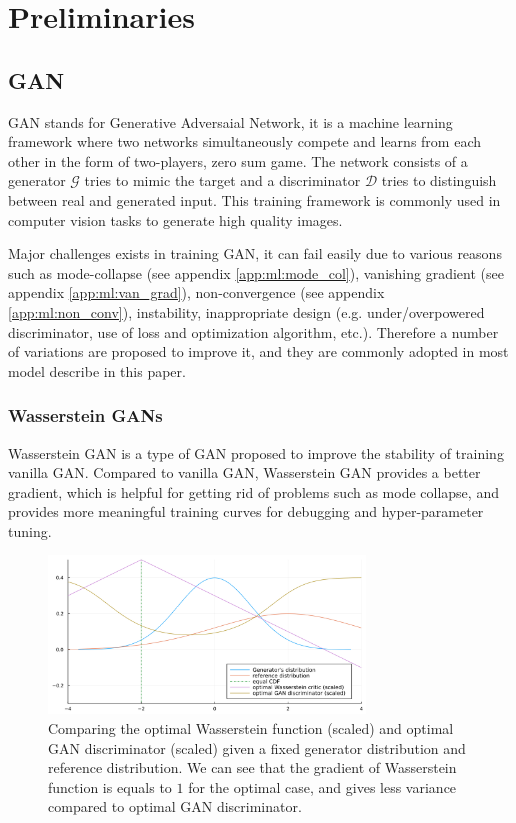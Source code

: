 \chapter{Preliminaries}
\label{chapterlabel2}

\section{GAN}

GAN stands for Generative Adversaial Network\cite{goodfellowGenerativeAdversarialNetworks2014a}, it is a machine learning framework where two networks simultaneously compete and learns from each other in the form of two-players, zero sum game. The network consists of a generator $\mathcal{G}$ tries to mimic the target and a discriminator $\mathcal{D}$ tries to distinguish between real and generated input. This training framework is commonly used in computer vision tasks to generate high quality images.

Major challenges exists in training GAN, it can fail easily due to various reasons such as mode-collapse (see appendix \ref{app:ml:mode_col}), vanishing gradient (see appendix \ref{app:ml:van_grad}), non-convergence (see appendix \ref{app:ml:non_conv}), instability, inappropriate design (e.g. under/overpowered discriminator, use of loss and optimization algorithm, etc.). Therefore a number of variations are proposed to improve it, and they are commonly adopted in most model describe in this paper.


\subsection{Wasserstein GANs}
Wasserstein GAN\cite{arjovskyWassersteinGAN2017} is a type of GAN proposed to improve the stability of training vanilla GAN. Compared to vanilla GAN, Wasserstein GAN provides a better gradient, which is helpful for getting rid of problems such as mode collapse, and provides more meaningful training curves for debugging and hyper-parameter tuning.

\begin{figure}
    \centering
    \includegraphics[width=0.75\textwidth]{images/preliminary/wgan_vs_gan_grad.png}
    \caption{Comparing the optimal Wasserstein function (scaled) and optimal GAN discriminator (scaled) given a fixed generator distribution and reference distribution. We can see that the gradient of Wasserstein function is equals to $1$ for the optimal case, and gives less variance compared to optimal GAN discriminator.\cite{FileWassersteinGANCritic}} 
    \label{fig:wgan_vs_gan_grad}
\end{figure}

